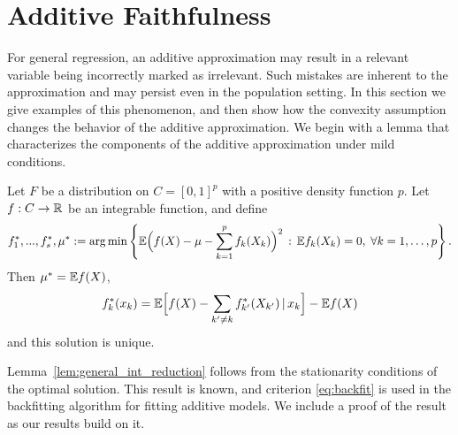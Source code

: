 
\section{Additive Faithfulness}
\label{sec:additivefaithful}

For general regression, an additive approximation may result in a
relevant variable being incorrectly marked as irrelevant. Such
mistakes are inherent to the approximation and may persist even in
the population setting.  In this section we give
examples of this phenomenon, and then show how the convexity
assumption
changes the behavior of the additive approximation. We begin
with a lemma that characterizes the components of the additive approximation under mild conditions.



\begin{lemma}
\label{lem:general_int_reduction}
Let $F$ be a distribution on $C=[0,1]^p$ with a positive density
function $p$. Let $f: C \rightarrow {\mathbb R}$ be an integrable function,
and define 
\begin{equation}
f^*_1,...,f^*_s, \mu^* := 
\arg\min \left\{ {\mathbb E} \Bigl( f(X) - \mu - \sum_{k=1}^p f_k(X_k)\Bigr)^2 \,:\,
{\mathbb E} f_k(X_k) = 0,\; \forall k=1,\ldots, p \right\}.
\end{equation}
Then $\mu^* = {\mathbb E} f(X)$,
\begin{equation}
\label{eq:backfit}
f^*_k(x_k) = {\mathbb E}\Bigl[ f(X) - \sum_{k' \neq k} f^*_{k'}(X_{k'}) {\,|\,}
x_k\Bigr] - {\mathbb E} f(X) 
\end{equation}
and this solution is unique.
\end{lemma}


Lemma~\ref{lem:general_int_reduction} follows from the stationarity
conditions of the optimal solution.   This result is known, and
criterion \eqref{eq:backfit} is used in the backfitting
algorithm for fitting additive models.   We include 
a proof of the result as our results build on it.

